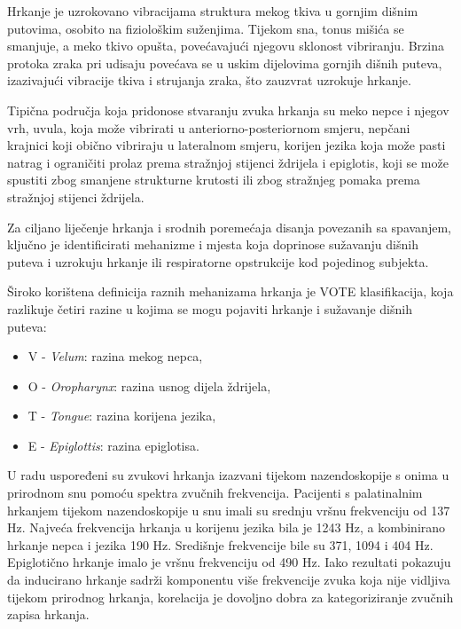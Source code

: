 Hrkanje je uzrokovano vibracijama struktura mekog tkiva u gornjim dišnim putovima, osobito na fiziološkim suženjima. 
Tijekom sna, tonus mišića se smanjuje, a meko tkivo opušta, povećavajući njegovu sklonost vibriranju. Brzina protoka zraka pri udisaju povećava se u uskim dijelovima gornjih dišnih puteva, izazivajući vibracije tkiva i strujanja zraka, što zauzvrat uzrokuje hrkanje.

Tipična područja koja pridonose stvaranju zvuka hrkanja su meko nepce i njegov vrh, uvula, koja može vibrirati u anteriorno-posteriornom smjeru, nepčani krajnici koji obično vibriraju u lateralnom smjeru, korijen jezika koja može pasti natrag i ograničiti prolaz prema stražnjoj stijenci ždrijela i epiglotis, koji se može spustiti zbog smanjene strukturne krutosti ili zbog stražnjeg pomaka prema stražnjoj stijenci ždrijela.

Za ciljano liječenje hrkanja i srodnih poremećaja disanja povezanih sa spavanjem, ključno je identificirati mehanizme i mjesta koja doprinose sužavanju dišnih puteva i uzrokuju hrkanje ili respiratorne opstrukcije kod pojedinog subjekta.


Široko korištena definicija raznih mehanizama hrkanja je VOTE klasifikacija, koja razlikuje četiri razine u kojima se mogu pojaviti hrkanje i sužavanje dišnih puteva:
\begin{itemize}
	\item V - \textit{Velum}: razina mekog nepca, 
	\item O - \textit{Oropharynx}: razina usnog dijela ždrijela,  
	\item T - \textit{Tongue}: razina korijena jezika, 
	\item E - \textit{Epiglottis}: razina epiglotisa. 
\end{itemize}

U radu \cite{bib} uspoređeni su zvukovi hrkanja izazvani tijekom nazendoskopije s onima u prirodnom snu pomoću spektra zvučnih frekvencija. Pacijenti s palatinalnim hrkanjem tijekom nazendoskopije u snu imali su srednju vršnu frekvenciju od 137 Hz. Najveća frekvencija hrkanja u korijenu jezika bila je 1243 Hz, a kombinirano hrkanje nepca i jezika 190 Hz. Središnje frekvencije bile su 371, 1094 i 404 Hz. Epiglotično hrkanje imalo je vršnu frekvenciju od 490 Hz. Iako rezultati pokazuju da inducirano hrkanje sadrži komponentu više frekvencije zvuka koja nije vidljiva tijekom prirodnog hrkanja, korelacija je dovoljno dobra za kategoriziranje zvučnih zapisa hrkanja. 

